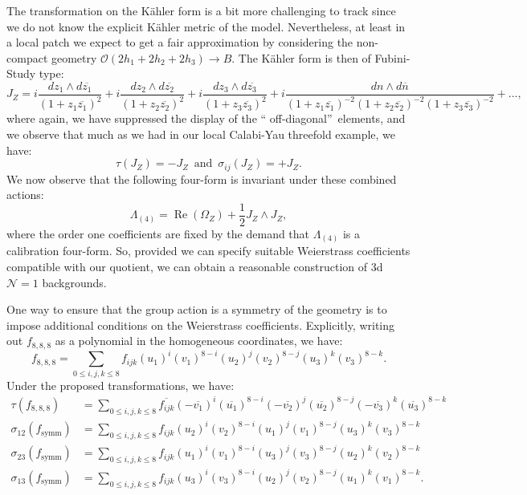 \documentclass[12pt]{article}%
\numberwithin{equation}{section}
\renewcommand{\(}{\left(}
\renewcommand{\)}{\right)}
\renewcommand{\[}{\left[}
\renewcommand{\]}{\right]}
\begin{document}
The transformation on the K\"ahler form is a bit more challenging to track since
we do not know the explicit K\"ahler metric of the model. Nevertheless, at least
in a local patch we expect to get a fair approximation by considering the
non-compact geometry $\mathcal{O}(2h_{1}+2h_{2}+2h_{3})\rightarrow B$. The K\"ahler form
is then of Fubini-Study type:%
\begin{equation}
J_{Z}=i\frac{dz_{1}\wedge d\overline{z_{1}}}{(1+z_{1}\overline{z_{1}})^{2}%
}+i\frac{dz_{2}\wedge d\overline{z_{2}}}{(1+z_{2}\overline{z_{2}})^{2}}%
+i\frac{dz_{3}\wedge d\overline{z_{3}}}{(1+z_{3}\overline{z_{3}})^{2}}%
+i\frac{dn\wedge d\overline{n}}{(1+z_{1}\overline{z_{1}})^{-2}(1+z_{2}%
\overline{z_{2}})^{-2}(1+z_{3}\overline{z_{3}})^{-2}}+...,
\end{equation}
where again, we have suppressed the display of the \textquotedblleft
off-diagonal\textquotedblright\ elements, and we observe that much as we had
in our local Calabi-Yau threefold example, we have:%
\begin{equation}
\tau(J_{Z}) = - J_{Z} \,\,\, \text{and} \,\,\, \sigma_{ij}(J_{Z})  = + J_{Z}.
\end{equation}
We now observe that the following four-form is invariant under these combined
actions:%
\begin{equation}
\Lambda_{(4)}=\operatorname{Re}\left(  \Omega_{Z}\right)  +\frac{1}{2}%
J_{Z}\wedge J_{Z},
\end{equation}
where the order one coefficients are fixed by the demand that $\Lambda_{(4)}$
is a calibration four-form. So, provided we can specify suitable Weierstrass coefficients compatible with
our quotient, we can obtain a reasonable construction of 3d $\mathcal{N}=1$
backgrounds.

One way to ensure that the group action is a symmetry of the
geometry is to impose additional conditions on the Weierstrass coefficients.
Explicitly, writing out $f_{8,8,8}$ as a polynomial in the homogeneous
coordinates, we have:%
\begin{equation}
f_{8,8,8}=\underset{0\leq i,j,k\leq8}{\sum}f_{ijk}(u_{1})^{i}(v_{1}%
)^{8-i}(u_{2})^{j}(v_{2})^{8-j}(u_{3})^{k}(v_{3})^{8-k}.
\end{equation}
Under the proposed transformations, we have:%
\begin{align}
\tau(f_{8,8,8})  & =\underset{0\leq i,j,k\leq8}{\sum}\overline{f_{ijk}%
}(-\overline{v_{1}})^{i}(\overline{u_{1}})^{8-i}(-\overline{v_{2}}%
)^{j}(\overline{u_{2}})^{8-j}(-\overline{v_{3}})^{k}(\overline{u_{3}})^{8-k}\\
\sigma_{12}(f_{\text{symm}})  & =\underset{0\leq i,j,k\leq8}{\sum}%
f_{ijk}(u_{2})^{i}(v_{2})^{8-i}(u_{1})^{j}(v_{1})^{8-j}(u_{3})^{k}%
(v_{3})^{8-k}\\
\sigma_{23}(f_{\text{symm}})  & =\underset{0\leq i,j,k\leq8}{\sum}%
f_{ijk}(u_{1})^{i}(v_{1})^{8-i}(u_{3})^{j}(v_{3})^{8-j}(u_{2})^{k}%
(v_{2})^{8-k}\\
\sigma_{13}(f_{\text{symm}})  & =\underset{0\leq i,j,k\leq8}{\sum}%
f_{ijk}(u_{3})^{i}(v_{3})^{8-i}(u_{2})^{j}(v_{2})^{8-j}(u_{1})^{k}%
(v_{1})^{8-k}.
\end{align}
\end{document}
